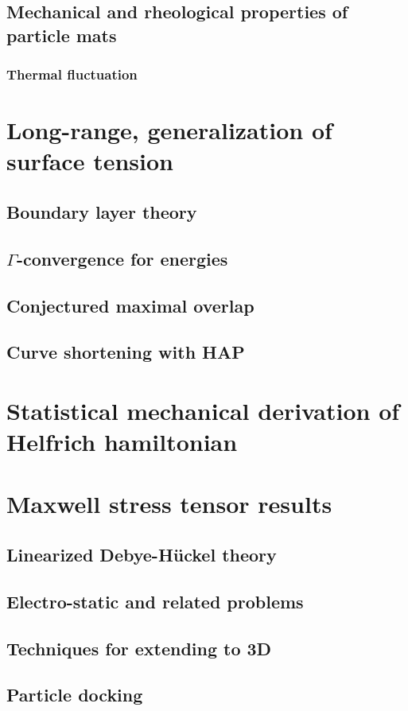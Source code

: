\documentclass[preprint,11pt]{article}
\begin{document}
\subsection{Mechanical and rheological properties of particle mats}
\subsubsection{Thermal fluctuation}
\section{Long-range, generalization of surface tension}
\subsection{Boundary layer theory}
\subsection{$\Gamma$-convergence for energies}
\subsection{Conjectured maximal overlap}
\subsection{Curve shortening with HAP}
\section{Statistical mechanical derivation of Helfrich hamiltonian} 
\section{Maxwell stress tensor results}
\subsection{Linearized Debye-H\"uckel theory}
\subsection{Electro-static and related problems}
\subsection{Techniques for extending to 3D}
\subsection{Particle docking}
\end{document}

